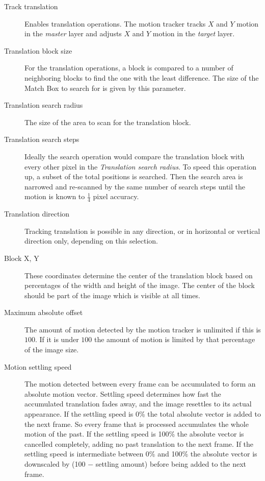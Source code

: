 \begin{description}
    \item[Track translation] Enables translation operations. The motion tracker tracks $X$ and $Y$ motion in the \textit{master} layer and adjusts $X$ and $Y$ motion in the \textit{target} layer.

    \item[Translation block size] For the translation operations, a block is compared to a number of neighboring blocks to find the one with the least difference. The size of the Match Box to search for is given by this parameter.
    \item[Translation search radius] The size of the area to scan for the translation block.
    \item[Translation search steps] Ideally the search operation would compare the translation block with every other pixel in the \textit{Translation search radius}. To speed this operation up, a subset of the total positions is searched. Then the search area is narrowed and re-scanned by the same number of search steps until the motion is known to $\frac{1}{4}$ pixel accuracy.
    \item[Translation direction] Tracking translation is possible in any direction, or in horizontal or vertical direction only, depending on this selection.
    \item[Block X, Y] These coordinates determine the center of the translation block based on percentages of the width and height of the image. The center of the block should be part of the image which is visible at all times.
    \item[Maximum absolute offset] The amount of motion detected by the motion tracker is unlimited if this is $100$. If it is under $100$ the amount of motion is limited by that percentage of the image size.
    \item[Motion settling speed] The motion detected between every frame can be accumulated to form an absolute motion vector. Settling speed determines how fast the accumulated translation fades away, and the image resettles to its actual appearance. If the settling speed is 0\% the total absolute vector is added to the next frame. So every frame that is processed accumulates the whole motion of the past. If the settling speed is 100\% the absolute vector is cancelled completely, adding no past translation to the next frame. If the settling speed is intermediate between 0\% and 100\% the absolute vector is downscaled by (100 $-$ settling amount) before being added to the next frame.

\end{description}
